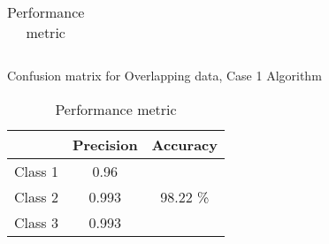 \documentclass[11pt,paper=a4,answers]{exam}
\begin{document}
\begin{questions}
\begin{enumerate}[i.]
\begin{enumerate}
\begin{table}[ht]
\begin{tabular}{c | c c c c | c | c |}
                    \end{tabular}
                    \caption{Confusion matrix for Overlapping data, Case 1 Algorithm}
                    \label{tab:d3con1}
                \endminipage\hfill
                    \begin{tabular}{| l | c | c |}
                        \hline
                        & Precision & Accuracy\\
                        \hline
                        Class 1 & 0.96 & \\
                        \cline{1-2}
                        Class 2 & 0.993 & 98.22 \%\\
                        \cline{1-2}
                        Class 3 & 0.993 & \\
                        \hline
                    \end{tabular}
                    \caption{Performance metric}
                \endminipage\hfill
            \end{table}\\
                        

\end{enumerate}
\end{enumerate}
\end{questions}
\end{document}
